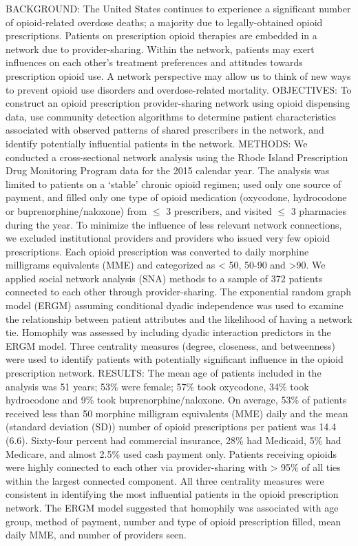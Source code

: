 \begin{itemize}
BACKGROUND: The United States continues to experience a significant number of opioid-related overdose deaths; a majority due to legally-obtained opioid prescriptions. Patients on prescription opioid therapies are embedded in a network due to provider-sharing. Within the network, patients may exert influences on each other’s treatment preferences and attitudes towards prescription opioid use. A network perspective may allow us to think of new ways to prevent opioid use disorders and overdose-related mortality.
OBJECTIVES: To construct an opioid prescription provider-sharing network using opioid dispensing data, use community detection algorithms to determine patient characteristics associated with observed patterns of shared prescribers in the network, and identify potentially influential patients in the network. 
METHODS: We conducted a cross-sectional network analysis using the Rhode Island Prescription Drug Monitoring Program data for the 2015 calendar year. The analysis was limited to patients on a ‘stable’ chronic opioid regimen; used only one source of payment, and filled only one type of opioid medication (oxycodone, hydrocodone or buprenorphine/naloxone) from $\le$ 3 prescribers, and visited $\le$ 3 pharmacies during the year. To minimize the influence of less relevant network connections, we excluded institutional providers and providers who issued very few opioid prescriptions. Each opioid prescription was converted to daily morphine milligrams equivalents (MME) and categorized as < 50, 50-90 and >90.  We applied social network analysis (SNA) methods to a sample of 372 patients connected to each other through provider-sharing. The exponential random graph model (ERGM) assuming conditional dyadic independence was used to examine the relationship between patient attributes and the likelihood of having a network tie. Homophily was assessed by including dyadic interaction predictors in the ERGM model. Three centrality measures (degree, closeness, and betweenness) were used to identify patients with potentially significant influence in the opioid prescription network. 
RESULTS: The mean age of patients included in the analysis was 51 years; 53\% were female; 57\% took oxycodone, 34\% took hydrocodone and 9\% took buprenorphine/naloxone. On average, 53\% of patients received less than 50 morphine milligram equivalents (MME) daily and the mean (standard deviation (SD)) number of opioid prescriptions per patient was 14.4 (6.6). Sixty-four percent had commercial insurance, 28\% had Medicaid, 5\% had Medicare, and almost 2.5\% used cash payment only. Patients receiving opioids were highly connected to each other via provider-sharing with > 95\% of all ties within the largest connected component. All three centrality measures were consistent in identifying the most influential patients in the opioid prescription network. The ERGM model suggested that homophily was associated with age group, method of payment, number and type of opioid prescription filled, mean daily MME, and number of providers seen.

\end{itemize}
